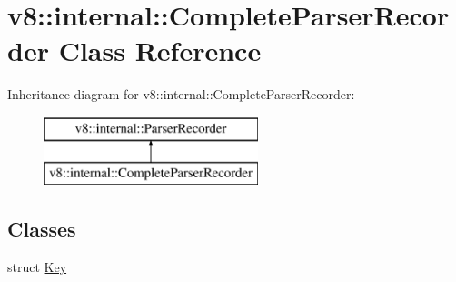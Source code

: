 \hypertarget{classv8_1_1internal_1_1_complete_parser_recorder}{}\section{v8\+:\+:internal\+:\+:Complete\+Parser\+Recorder Class Reference}
\label{classv8_1_1internal_1_1_complete_parser_recorder}
Inheritance diagram for v8\+:\+:internal\+:\+:Complete\+Parser\+Recorder\+:\begin{figure}[H]
\begin{center}
\leavevmode
\includegraphics[height=2.000000cm]{classv8_1_1internal_1_1_complete_parser_recorder}
\end{center}
\end{figure}
\subsection*{Classes}
\begin{DoxyCompactItemize}
\item 
struct \hyperlink{structv8_1_1internal_1_1_complete_parser_recorder_1_1_key}{Key}
\end{DoxyCompactItemize}
